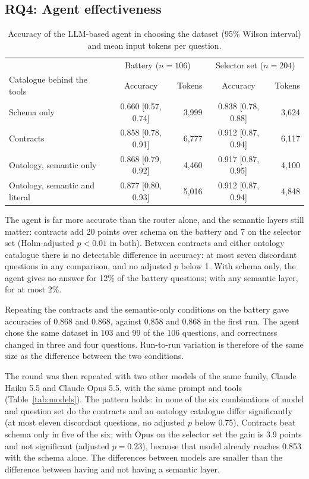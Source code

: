 \subsection{RQ4: Agent effectiveness}
\begin{table}[ht]
\centering\small
\caption{Accuracy of the LLM-based agent in choosing the dataset (95\% Wilson interval) and
mean input tokens per question.}
\label{tab:agent}
\begin{tabular}{lcrcr}
\toprule
 & \multicolumn{2}{c}{Battery ($n=106$)} & \multicolumn{2}{c}{Selector set ($n=204$)} \\
Catalogue behind the tools & Accuracy & Tokens & Accuracy & Tokens \\
\midrule
Schema only & 0.660 [0.57, 0.74] & 3{,}999 & 0.838 [0.78, 0.88] & 3{,}624 \\
Contracts & 0.858 [0.78, 0.91] & 6{,}777 & 0.912 [0.87, 0.94] & 6{,}117 \\
Ontology, semantic only & 0.868 [0.79, 0.92] & 4{,}460 & 0.917 [0.87, 0.95] & 4{,}100 \\
Ontology, semantic and literal & 0.877 [0.80, 0.93] & 5{,}016 & 0.912 [0.87, 0.94] & 4{,}848 \\
\bottomrule
\end{tabular}
\end{table}

The agent is far more accurate than the router alone, and the semantic layers still matter:
contracts add 20 points over schema on the battery and 7 on the selector set (Holm-adjusted
$p<0.01$ in both). Between contracts and either ontology catalogue there is no detectable
difference in accuracy: at most seven discordant questions in any comparison, and no adjusted $p$ below 1. With
schema only, the agent gives no answer for 12\% of the battery questions; with any semantic
layer, for at most 2\%.

Repeating the contracts and the semantic-only conditions on the battery gave accuracies of
0.868 and 0.868, against 0.858 and 0.868 in the first run. The agent chose the same dataset
in 103 and 99 of the 106 questions, and correctness changed in three and four questions.
Run-to-run variation is therefore of the same size as the difference between the two
conditions.

The round was then repeated with two other models of the same family, Claude Haiku 5.5 and
Claude Opus 5.5, with the same prompt and tools (Table~\ref{tab:models}). The pattern holds:
in none of the six combinations of model and question set do the contracts and an ontology
catalogue differ significantly (at most eleven discordant questions, no adjusted $p$ below
0.75). Contracts beat schema only in five of the six; with Opus on the selector set the
gain is 3.9 points and not significant (adjusted $p=0.23$), because that model already
reaches 0.853 with the schema alone. The differences between models are smaller than the
difference between having and not having a semantic layer.

